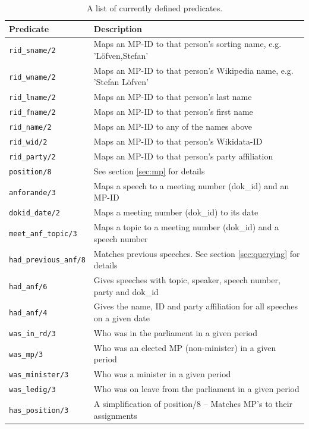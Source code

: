 \begin{table}[t!]
\fontsize{10pt}{12pt}\selectfont
\begin{center}
\begin{tabular}{|l|l|}
\hline \textbf{Predicate} & \textbf{Description} \\ \hline
\texttt{rid\_sname/2} & Maps an MP-ID to that person's sorting name, e.g. 'Löfven,Stefan' \\
\texttt{rid\_wname/2} & Maps an MP-ID to that person's Wikipedia name, e.g. 'Stefan Löfven' \\
\texttt{rid\_lname/2} & Maps an MP-ID to that person's last name \\
\texttt{rid\_fname/2} & Maps an MP-ID to that person's first name \\
\texttt{rid\_name/2} & Maps an MP-ID to any of the names above \\
\texttt{rid\_wid/2} & Maps an MP-ID to that person's Wikidata-ID \\
\texttt{rid\_party/2} & Maps an MP-ID to that person's party affiliation \\
\texttt{position/8} & See section \ref{sec:mp} for details \\
\texttt{anforande/3} & Maps a speech to a meeting number (dok\_id) and an MP-ID \\
\texttt{dokid\_date/2} & Maps a meeting number (dok\_id) to its date \\
\texttt{meet\_anf\_topic/3} & Maps a topic to a meeting number (dok\_id) and a speech number \\
\texttt{had\_previous\_anf/8} & Matches previous speeches. See section \ref{sec:querying} for details\\
\texttt{had\_anf/6} & Gives speeches with topic, speaker, speech number, 
   party and dok\_id  \\
\texttt{had\_anf/4} & Gives the name, ID and party affiliation for all speeches
   on a given date \\
\texttt{was\_in\_rd/3} & Who was in the parliament in a given period \\
\texttt{was\_mp/3} & Who was an elected MP (non-minister) in a given period \\
\texttt{was\_minister/3} & Who was a minister in a given period \\
\texttt{was\_ledig/3} & Who was on leave from the parliament in a given period \\
\texttt{has\_position/3} & A simplification of position/8 --
   Matches MP's to their assignments \\
\hline
\end{tabular}
\end{center}
\normalfont
\caption{\label{pred-table} A list of currently defined predicates. }
\end{table}

